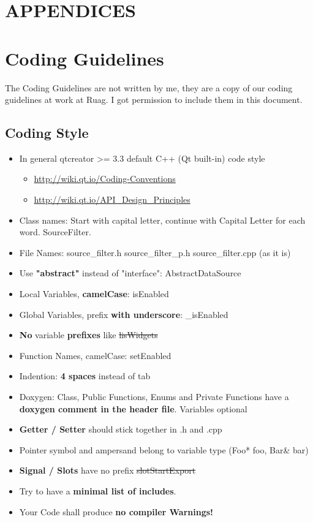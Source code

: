 \chapter*{APPENDICES}

\begingroup\let\clearpage\relax
\chapter{Coding Guidelines}
\label{chap:Coding Conventions}

The Coding Guidelines are not written by me, they are a copy of our coding guidelines at work at Ruag. I got permission to include them in this document. 
\section{Coding Style}
\begin{itemize}
	\item In general qtcreator >= 3.3 default C++ (Qt built-in) code style
	\begin{itemize}
		\item	\url{http://wiki.qt.io/Coding-Conventions}
		\item	\url{http://wiki.qt.io/API_Design_Principles}
	\end{itemize}
	\item Class names: Start with capital letter, continue with Capital Letter for each word. SourceFilter.
	\item File Names: source\_filter.h source\_filter\_p.h source\_filter.cpp (as it is)
	\item Use \textbf{"abstract"} instead of "interface": AbstractDataSource
	\item Local Variables, \textbf{camelCase}: isEnabled
	\item Global Variables, prefix \textbf{with underscore}: \_isEnabled
	\item \textbf{No} variable \textbf{prefixes} like \sout{lisWidgets}
	\item Function Names, camelCase: setEnabled
	\item Indention: \textbf{4 spaces} instead of tab
	\item Doxygen: Class, Public Functions, Enums and Private Functions have a \textbf{doxygen comment in the header file}. Variables optional
	\item \textbf{Getter / Setter} should stick together in .h and .cpp
	\item Pointer symbol and ampersand belong to variable type (Foo* foo, Bar\& bar)
	\item \textbf{Signal / Slots} have no prefix \sout{slotStartExport}
	\item Try to have a \textbf{minimal list of includes}.
	\item Your Code shall produce \textbf{no compiler Warnings!}
\end{itemize}

